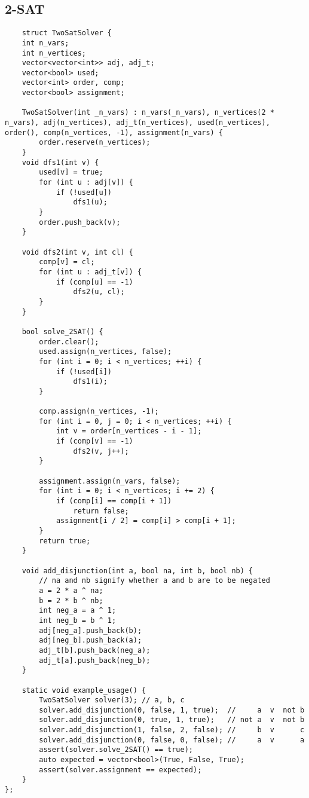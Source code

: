 \documentclass{article}
\begin{document}
\subsection{2-SAT}

\begin{lstlisting}
    struct TwoSatSolver {
    int n_vars;
    int n_vertices;
    vector<vector<int>> adj, adj_t;
    vector<bool> used;
    vector<int> order, comp;
    vector<bool> assignment;

    TwoSatSolver(int _n_vars) : n_vars(_n_vars), n_vertices(2 * n_vars), adj(n_vertices), adj_t(n_vertices), used(n_vertices), order(), comp(n_vertices, -1), assignment(n_vars) {
        order.reserve(n_vertices);
    }
    void dfs1(int v) {
        used[v] = true;
        for (int u : adj[v]) {
            if (!used[u])
                dfs1(u);
        }
        order.push_back(v);
    }

    void dfs2(int v, int cl) {
        comp[v] = cl;
        for (int u : adj_t[v]) {
            if (comp[u] == -1)
                dfs2(u, cl);
        }
    }

    bool solve_2SAT() {
        order.clear();
        used.assign(n_vertices, false);
        for (int i = 0; i < n_vertices; ++i) {
            if (!used[i])
                dfs1(i);
        }

        comp.assign(n_vertices, -1);
        for (int i = 0, j = 0; i < n_vertices; ++i) {
            int v = order[n_vertices - i - 1];
            if (comp[v] == -1)
                dfs2(v, j++);
        }

        assignment.assign(n_vars, false);
        for (int i = 0; i < n_vertices; i += 2) {
            if (comp[i] == comp[i + 1])
                return false;
            assignment[i / 2] = comp[i] > comp[i + 1];
        }
        return true;
    }

    void add_disjunction(int a, bool na, int b, bool nb) {
        // na and nb signify whether a and b are to be negated 
        a = 2 * a ^ na;
        b = 2 * b ^ nb;
        int neg_a = a ^ 1;
        int neg_b = b ^ 1;
        adj[neg_a].push_back(b);
        adj[neg_b].push_back(a);
        adj_t[b].push_back(neg_a);
        adj_t[a].push_back(neg_b);
    }

    static void example_usage() {
        TwoSatSolver solver(3); // a, b, c
        solver.add_disjunction(0, false, 1, true);  //     a  v  not b
        solver.add_disjunction(0, true, 1, true);   // not a  v  not b
        solver.add_disjunction(1, false, 2, false); //     b  v      c
        solver.add_disjunction(0, false, 0, false); //     a  v      a
        assert(solver.solve_2SAT() == true);
        auto expected = vector<bool>(True, False, True);
        assert(solver.assignment == expected);
    }
};
\end{lstlisting}
\end{document}
